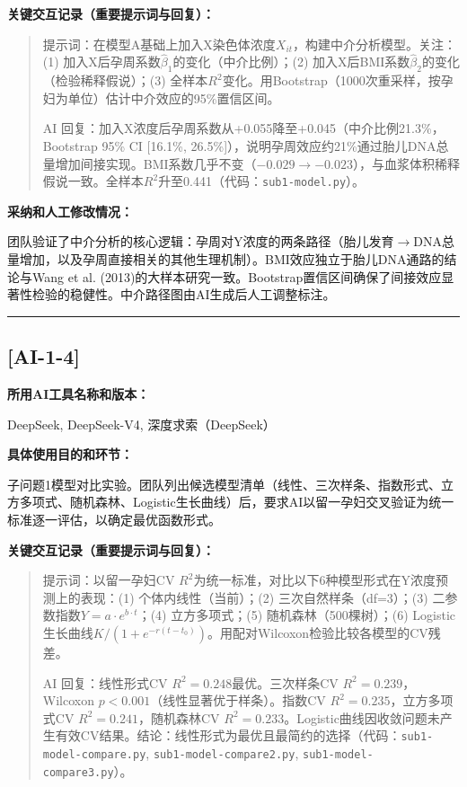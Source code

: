 \documentclass[12pt,a4paper]{ctexart}
\begin{document}
\textbf{关键交互记录（重要提示词与回复）：}

\begin{quote}
提示词：在模型A基础上加入X染色体浓度$X_{it}$，构建中介分析模型。关注：(1) 加入X后孕周系数$\hat{\beta}_1$的变化（中介比例）；(2) 加入X后BMI系数$\hat{\beta}_2$的变化（检验稀释假说）；(3) 全样本$R^2$变化。用Bootstrap（1000次重采样，按孕妇为单位）估计中介效应的95\%置信区间。

AI 回复：加入X浓度后孕周系数从+0.055降至+0.045（中介比例21.3\%，Bootstrap 95\% CI [16.1\%, 26.5\%]），说明孕周效应约21\%通过胎儿DNA总量增加间接实现。BMI系数几乎不变（$-0.029\rightarrow-0.023$），与血浆体积稀释假说一致。全样本$R^2$升至0.441（代码：\texttt{sub1-model.py}）。
\end{quote}

\textbf{采纳和人工修改情况：}

团队验证了中介分析的核心逻辑：孕周对Y浓度的两条路径（胎儿发育$\to$DNA总量增加，以及孕周直接相关的其他生理机制）。BMI效应独立于胎儿DNA通路的结论与Wang et al. (2013)的大样本研究一致。Bootstrap置信区间确保了间接效应显著性检验的稳健性。中介路径图由AI生成后人工调整标注。

\vspace{1em}
\hrule
\vspace{1em}

\subsection*{[AI-1-4]}

\textbf{所用AI工具名称和版本：}

DeepSeek, DeepSeek-V4, 深度求索（DeepSeek）

\textbf{具体使用目的和环节：}

子问题1模型对比实验。团队列出候选模型清单（线性、三次样条、指数形式、立方多项式、随机森林、Logistic生长曲线）后，要求AI以留一孕妇交叉验证为统一标准逐一评估，以确定最优函数形式。

\textbf{关键交互记录（重要提示词与回复）：}

\begin{quote}
提示词：以留一孕妇CV $R^2$为统一标准，对比以下6种模型形式在Y浓度预测上的表现：(1) 个体内线性（当前）；(2) 三次自然样条（df=3）；(3) 二参数指数$Y=a\cdot e^{b\cdot t}$；(4) 立方多项式；(5) 随机森林（500棵树）；(6) Logistic生长曲线$K/(1+e^{-r(t-t_0)})$。用配对Wilcoxon检验比较各模型的CV残差。

AI 回复：线性形式CV $R^2=0.248$最优。三次样条CV $R^2=0.239$，Wilcoxon $p<0.001$（线性显著优于样条）。指数CV $R^2=0.235$，立方多项式CV $R^2=0.241$，随机森林CV $R^2=0.233$。Logistic曲线因收敛问题未产生有效CV结果。结论：线性形式为最优且最简约的选择（代码：\texttt{sub1-model-compare.py}, \texttt{sub1-model-compare2.py}, \texttt{sub1-model-compare3.py}）。
\end{quote}
\end{document}
